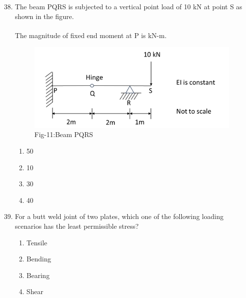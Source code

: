 \documentclass[journal]{IEEEtran}
\theoremstyle{remark}
\begin{document}
\begin{enumerate}[itemsep=1em]
\setcounter{enumi}{37}
\item The beam PQRS is subjected to a vertical point load of 10 kN at point S as shown in the figure. \\
\\
The magnitude of fixed end moment at P is \underline{\hspace{2cm}} kN-m. 
\begin{figure}[H]
    \centering
    \includegraphics[width=0.4\columnwidth]{figs/fig-11.jpeg}
    \caption*{Fig-11:Beam PQRS}
    \label{fig:11}
\end{figure}
\begin{multicols}{4}
\begin{enumerate}
    \item 50
    \item 10
    \item 30
    \item 40
\end{enumerate}    
\end{multicols}
\end{enumerate}

\begin{enumerate}[itemsep=1em]
\setcounter{enumi}{38}
\item For a butt weld joint of two plates, which one of the following loading scenarios has the least permissible stress?  
\begin{multicols}{4}
\begin{enumerate}
    \item Tensile
    \item Bending
    \item Bearing
    \item Shear
\end{enumerate}
\end{multicols}
\end{enumerate}

\newpage
\vspace*{0.25cm}
\end{document}
